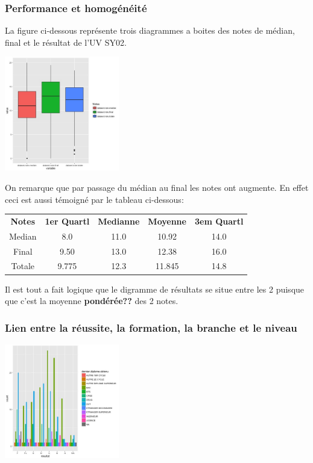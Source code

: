 \documentclass[]{report}
\begin{document}
\subsubsection{Performance et homogénéité}
La figure ci-dessous représente trois diagrammes a boites des notes de médian, final et le résultat de l'UV SY02.
	\begin{center}
			\includegraphics[width=50mm]{Figures/Notes/boxplot_exam.jpg}
		    \label{fig:Boxplot_notes}
	\end{center}

On remarque que par passage du médian au final les notes ont augmente. En effet ceci est aussi témoigné par le tableau ci-dessous:

\begin{center}
	\begin{tabular}{c c c c c }
		\textbf{Notes} & \textbf{1er Quartl} & \textbf{Medianne}   & \textbf{Moyenne} & \textbf{3em Quartl} \\
		Median  & 8.0 			& 11.0		 & 10.92      & 14.0\\
		Final      & 9.50 		  & 13.0 	   & 12.38	    & 16.0\\
		Totale   & 9.775        & 12.3       &  11.845    & 14.8\\
	\end{tabular}
\end{center} 

Il est tout a fait logique que le digramme de résultats se situe entre les 2 puisque que c'est la moyenne \textbf{pondérée??} des 2 notes.
 
	
\subsubsection{Lien entre la réussite, la formation, la branche et le niveau}

	\begin{center}
	\includegraphics[width=50mm]{Figures/Notes/diplome_resultat.jpg}
	\label{fig:formation_resultat}
	\end{center}
\end{document}
